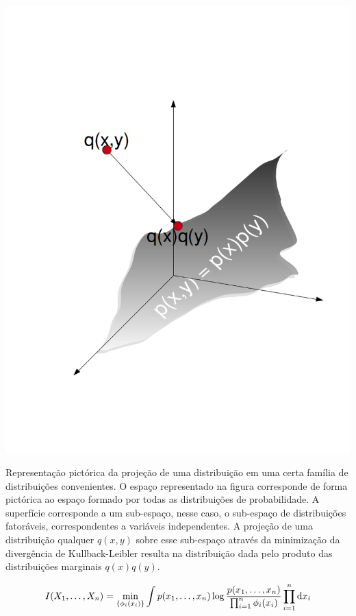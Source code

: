 \begin{marginfigure}[-5em]
	\centering
    	\includegraphics[width = \textwidth]{figuras/distributionmanyfold.png}
 	\caption[Representação pictórica da projeção de uma distribuição.]{\label{fig:distributionmanyfold} Representação pictórica da projeção de uma distribuição em uma certa família de distribuições convenientes. O espaço representado na figura corresponde de forma pictórica ao espaço formado por todas as distribuições de probabilidade. A superfície corresponde a um sub-espaço, nesse caso, o sub-espaço de distribuições fatoráveis, correspondentes a variáveis independentes. A projeção de uma distribuição qualquer $q(x,y)$ sobre esse sub-espaço através da minimização da divergência de Kullback-Leibler resulta na distribuição dada pelo produto das distribuições marginais $q(x)q(y)$. }

\end{marginfigure}
\begin{equation}
\label{eq:infomutua}
I(X_1,\ldots, X_n) = \min_{\{\phi_i(x_i)\}} \int p(x_1,\ldots, x_n) \log \frac{p(x_1,\ldots, x_n)}{\prod_{i=1}^{n}\phi_i(x_i)} \prod_{i=1}^{n}\ud x_i
\end{equation}
